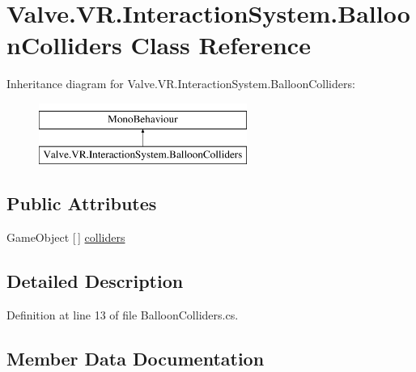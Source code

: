 \hypertarget{class_valve_1_1_v_r_1_1_interaction_system_1_1_balloon_colliders}{}\section{Valve.\+V\+R.\+Interaction\+System.\+Balloon\+Colliders Class Reference}
\label{class_valve_1_1_v_r_1_1_interaction_system_1_1_balloon_colliders}
Inheritance diagram for Valve.\+V\+R.\+Interaction\+System.\+Balloon\+Colliders\+:\begin{figure}[H]
\begin{center}
\leavevmode
\includegraphics[height=2.000000cm]{class_valve_1_1_v_r_1_1_interaction_system_1_1_balloon_colliders}
\end{center}
\end{figure}
\subsection*{Public Attributes}
\begin{DoxyCompactItemize}
\item 
Game\+Object \mbox{[}$\,$\mbox{]} \mbox{\hyperlink{class_valve_1_1_v_r_1_1_interaction_system_1_1_balloon_colliders_a7ad0b9755fec33956d8e1184bd5685d8}{colliders}}
\end{DoxyCompactItemize}


\subsection{Detailed Description}


Definition at line 13 of file Balloon\+Colliders.\+cs.



\subsection{Member Data Documentation}
\mbox{\label{class_valve_1_1_v_r_1_1_interaction_system_1_1_balloon_colliders_a7ad0b9755fec33956d8e1184bd5685d8}} 
